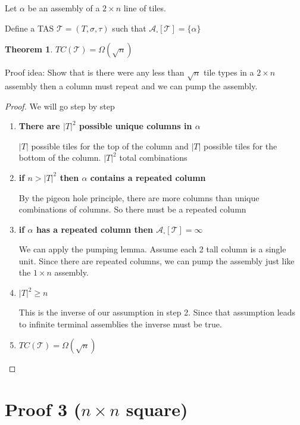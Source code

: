 \documentclass[12pt]{article}
\newtheorem{theorem}{Theorem}
\begin{document}
Let $\alpha$ be an assembly of a $2 \times n$ line of tiles.

Define a TAS $\mathcal{T} = (T, \sigma, \tau)$ such that $\mathcal{A}_\square[\mathcal{T}] = \{ \alpha \}$

\begin{theorem}
	$TC(\mathcal{T}) = \Omega(\sqrt{n})$
\end{theorem}

Proof idea: Show that is there were any less than $\sqrt{n}$ tile types in a $2 \times n$ assembly then a column must repeat and we can pump the assembly.

\begin{proof}
		We will go step by step
	\begin{enumerate}

		\item \textbf{There are $|T|^2$ possible unique columns in $\alpha$}

		$|T|$ possible tiles for the top of the column and $|T|$ possible tiles for the bottom of the column. $|T|^2$ total combinations

		\item \textbf{if $n > |T|^2$ then $\alpha$ contains a repeated column}

		By the pigeon hole principle, there are more columns than unique combinations of columns. So there must be a repeated column

		\item \textbf{if $\alpha$ has a repeated column then $\mathcal{A}_\square[\mathcal{T}] = \infty$}

		We can apply the pumping lemma. Assume each 2 tall column is a single unit. Since there are repeated columns, we can pump the assembly just like the $1 \times n$ assembly.

		\item \textbf{$|T|^2 \geq n$}

		This is the inverse of our assumption in step 2. Since that assumption leads to infinite terminal assemblies the inverse must be true.

		\item \textbf{$TC(\mathcal{T}) = \Omega(\sqrt{n})$}

	\end{enumerate}
\end{proof}


\section*{Proof 3 ($n \times n$ square)}
\end{document}
